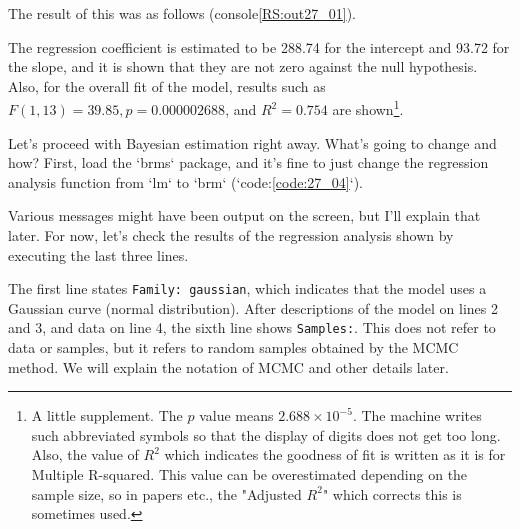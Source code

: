 \documentclass{ltjsarticle}
\begin{document}
The result of this was as follows (console\ref{RS:out27_01}).

The regression coefficient is estimated to be 288.74 for the intercept and 93.72 for the slope, and it is shown that they are not zero against the null hypothesis. Also, for the overall fit of the model, results such as $F(1,13)=39.85, p=0.000002688$, and $R^2=0.754$ are shown\footnote{A little supplement. The $p$ value means $2.688\times 10^{-5}$. The machine writes such abbreviated symbols so that the display of digits does not get too long. Also, the value of $R^2$ which indicates the goodness of fit is written as it is for Multiple R-squared. This value can be overestimated depending on the sample size, so in papers etc., the "Adjusted $R^2$" which corrects this is sometimes used.}.

Let's proceed with Bayesian estimation right away. What's going to change and how?
First, load the `brms` package, and it's fine to just change the regression analysis function from `lm` to `brm` (`code:\ref{code:27_04}`).



Various messages might have been output on the screen, but I'll explain that later. For now, let's check the results of the regression analysis shown by executing the last three lines.

The first line states \texttt{Family: gaussian}, which indicates that the model uses a Gaussian curve (normal distribution). After descriptions of the model on lines 2 and 3, and data on line 4, the sixth line shows \texttt{Samples:}. This does not refer to data or samples, but it refers to random samples obtained by the MCMC method. We will explain the notation of MCMC and other details later.
\end{document}

